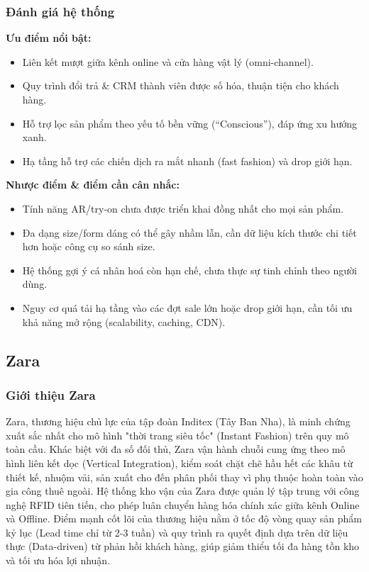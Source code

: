 \subsubsection{Đánh giá hệ thống}

\textbf{Ưu điểm nổi bật:}
\begin{itemize}
  \item Liên kết mượt giữa kênh online và cửa hàng vật lý (omni-channel).
  \item Quy trình đổi trả \& CRM thành viên được số hóa, thuận tiện cho khách hàng.
  \item Hỗ trợ lọc sản phẩm theo yếu tố bền vững (``Conscious''), đáp ứng xu hướng xanh.
  \item Hạ tầng hỗ trợ các chiến dịch ra mắt nhanh (fast fashion) và drop giới hạn.
\end{itemize}

\newpage
\textbf{Nhược điểm \& điểm cần cân nhắc:}
\begin{itemize}
  \item Tính năng AR/try-on chưa được triển khai đồng nhất cho mọi sản phẩm.
  \item Đa dạng size/form dáng có thể gây nhầm lẫn, cần dữ liệu kích thước chi tiết hơn hoặc công cụ so sánh size.
  \item Hệ thống gợi ý cá nhân hoá còn hạn chế, chưa thực sự tinh chỉnh theo người dùng.
  \item Nguy cơ quá tải hạ tầng vào các đợt sale lớn hoặc drop giới hạn, cần tối ưu khả năng mở rộng (scalability, caching, CDN).
\end{itemize}
\subsection{Zara}
\subsubsection{Giới thiệu Zara}
Zara, thương hiệu chủ lực của tập đoàn Inditex (Tây Ban Nha), là minh chứng xuất sắc nhất cho mô hình "thời trang siêu tốc" (Instant Fashion) trên quy mô toàn cầu. Khác biệt với đa số đối thủ, Zara vận hành chuỗi cung ứng theo mô hình liên kết dọc (Vertical Integration), kiểm soát chặt chẽ hầu hết các khâu từ thiết kế, nhuộm vải, sản xuất cho đến phân phối thay vì phụ thuộc hoàn toàn vào gia công thuê ngoài. Hệ thống kho vận của Zara được quản lý tập trung với công nghệ RFID tiên tiến, cho phép luân chuyển hàng hóa chính xác giữa kênh Online và Offline. Điểm mạnh cốt lõi của thương hiệu nằm ở tốc độ vòng quay sản phẩm kỷ lục (Lead time chỉ từ 2-3 tuần) và quy trình ra quyết định dựa trên dữ liệu thực (Data-driven) từ phản hồi khách hàng, giúp giảm thiểu tối đa hàng tồn kho và tối ưu hóa lợi nhuận.

